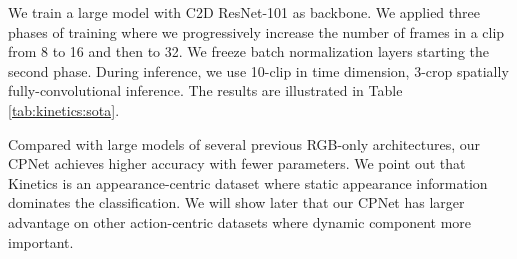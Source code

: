 \documentclass[10pt,twocolumn,letterpaper]{article}
\begin{document}
We train a large model with C2D ResNet-101 as backbone. We applied three phases of training where we progressively increase the number of frames in a clip from 8 to 16 and then to 32. We freeze batch normalization layers starting the second phase. During inference, we use 10-clip in time dimension, 3-crop spatially fully-convolutional inference. The results are illustrated in Table \ref{tab:kinetics:sota}.

Compared with large models of several previous RGB-only architectures, our CPNet achieves higher accuracy with fewer parameters. We point out that Kinetics is an appearance-centric dataset where static appearance information dominates the classification. We will show later that our CPNet has larger advantage on other action-centric datasets where dynamic component more important.
\end{document}
